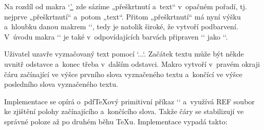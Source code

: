 Na rozdíl od makra `\ul` zde sázíme „přeškrtnutí a~text“ v~opačném pořadí, tj. nejprve „přeškrtnutí“ a~potom „text“. Přitom „přeškrtnutí“ má nyní výšku a~hloubku danou makrem `\coltextstrut`, tedy je natolik široké, že vytvoří podbarvení. V~úvodu makra `\coltext` je také v~odpovídajících barvách připraven `\hyphenchar` jako ``. 


 


Uživatel uzavře vyznačovaný text pomocí `\beginspec...\endspec`. Začátek textu může být někde uvnitř odstavce a~konec třeba v~dalším odstavci. Makro vytvoří v~pravém okraji čáru začínající ve výšce prvního slova vyznačeného textu a~končící ve výšce posledního slova vyznačeného textu. 



Implementace se opírá o~pdfTeXový primitivní příkaz `\pdfsavepos` a~využívá REF soubor ke zjištění polohy začínajícího a~končícího slova. Takže čáry se stabilizují ve správné poloze až po druhém běhu TeXu. Implementace vypadá takto: 

\begtt
\def\preparespec#1{\expandafter\ifx \csname spec:#1\endcsname \relax \sdef{spec:#1}{}\fi} 
\def\XspecB#1{\preparespec{\the\lastpage} 
    \expandafter\addto\csname spec:\the\lastpage\endcsname{,\specdraw{#1}}} 
\def\XspecE#1{\preparespec{\the\lastpage} 
    \expandafter\addto\csname spec:\the\lastpage\endcsname{{#1}}} 
 
 
\newif\ifspecenv \specenvfalse 
\def\beginspec{\ifspecenv \opwarning{\noexpand\beginspec inside spec environment, ignored}%
   \else \global\specenvtrue \openref 
      \ifvmode \pdfsavepos \else \vbox to0pt{\vss\pdfsavepos\kern\ht\strutbox}\fi 
      \wref\XspecB{{\the\pdflastypos}}\fi 
} 
\def\endspec{\ifspecenv \global\specenvfalse 
      \ifvmode \pdsavepos \else\vbox to0pt{\kern\dp\strutbox\pdfsavepos\vss}\fi 
      \wref\XspecE{{\the\pdflastypos}}%
   \else \opwarning{\noexpand\endspec outside spec environment, ignored}\fi 
} 
\def\prepghook{\moveright\hsize\vbox to0pt{\preparespec{\the\pageno} 
   \expandafter\expandafter\expandafter 
   \specdrawB\csname spec:\the\pageno\endcsname \botypos\relax}\nointerlineskip 
} 
\def\specdraw#1#2#3{\moveright 5pt\vbox to0pt{ 
   \tmpnum=\topypos \advance\tmpnum by-#1 \kern\tmpnum sp 
   \tmpnum=-#2 \advance\tmpnum by#1 \hrule height\tmpnum sp width 2pt \vss}\nointerlineskip 
   \ifx#3\relax \global\let\specdrawB=\specdrawBrun \fi 
} 
\def\specdrawB#1{} 
\def\specdrawBrun#1#2{\gdef\specdrawB##1{}\specdraw{\topypos}{#1}{#2}} 
 
